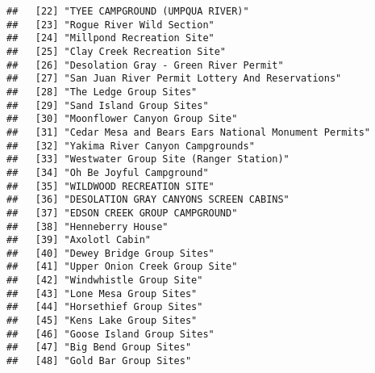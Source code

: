 \documentclass[
]{article}
\begin{document}
\begin{verbatim}
##   [22] "TYEE CAMPGROUND (UMPQUA RIVER)"                                                      
##   [23] "Rogue River Wild Section"                                                            
##   [24] "Millpond Recreation Site"                                                            
##   [25] "Clay Creek Recreation Site"                                                          
##   [26] "Desolation Gray - Green River Permit"                                                
##   [27] "San Juan River Permit Lottery And Reservations"                                      
##   [28] "The Ledge Group Sites"                                                               
##   [29] "Sand Island Group Sites"                                                             
##   [30] "Moonflower Canyon Group Site"                                                        
##   [31] "Cedar Mesa and Bears Ears National Monument Permits"                                 
##   [32] "Yakima River Canyon Campgrounds"                                                     
##   [33] "Westwater Group Site (Ranger Station)"                                               
##   [34] "Oh Be Joyful Campground"                                                             
##   [35] "WILDWOOD RECREATION SITE"                                                            
##   [36] "DESOLATION GRAY CANYONS SCREEN CABINS"                                               
##   [37] "EDSON CREEK GROUP CAMPGROUND"                                                        
##   [38] "Henneberry House"                                                                    
##   [39] "Axolotl Cabin"                                                                       
##   [40] "Dewey Bridge Group Sites"                                                            
##   [41] "Upper Onion Creek Group Site"                                                        
##   [42] "Windwhistle Group Site"                                                              
##   [43] "Lone Mesa Group Sites"                                                               
##   [44] "Horsethief Group Sites"                                                              
##   [45] "Kens Lake Group Sites"                                                               
##   [46] "Goose Island Group Sites"                                                            
##   [47] "Big Bend Group Sites"                                                                
##   [48] "Gold Bar Group Sites"                                                                

\end{verbatim}
\end{document}
